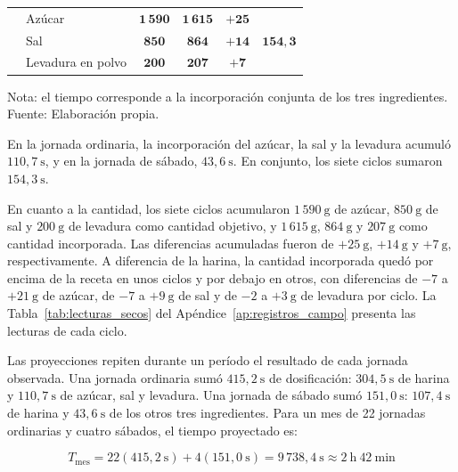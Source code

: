 \begin{table}[H]
\begin{tabular}{llcccc}
         &
        Azúcar & $\mathbf{1\,590}$ & $\mathbf{1\,615}$ & $\mathbf{+25}$ &
         \\
        & Sal & $\mathbf{850}$ & $\mathbf{864}$ & $\mathbf{+14}$ & \\
        & Levadura en polvo & $\mathbf{200}$ & $\mathbf{207}$ &
        $\mathbf{+7}$ & \\
        \bottomrule[1pt]
    \end{tabular}

    \vspace{0.5em}

    {\footnotesize
    Nota: el tiempo corresponde a la incorporación conjunta de los tres
    ingredientes.\\
    Fuente: Elaboración propia.}
\end{table}

En la jornada ordinaria, la incorporación del azúcar, la sal y la levadura
acumuló $110{,}7\ \mathrm{s}$, y en la jornada de sábado,
$43{,}6\ \mathrm{s}$. En conjunto, los siete ciclos sumaron
$154{,}3\ \mathrm{s}$.

En cuanto a la cantidad, los siete ciclos acumularon $1\,590\ \mathrm{g}$
de azúcar, $850\ \mathrm{g}$ de sal y $200\ \mathrm{g}$ de levadura como
cantidad objetivo, y $1\,615\ \mathrm{g}$, $864\ \mathrm{g}$ y
$207\ \mathrm{g}$ como cantidad incorporada. Las diferencias acumuladas
fueron de $+25\ \mathrm{g}$, $+14\ \mathrm{g}$ y $+7\ \mathrm{g}$,
respectivamente. A diferencia de la harina, la cantidad incorporada quedó
por encima de la receta en unos ciclos y por debajo en otros, con
diferencias de $-7$ a $+21\ \mathrm{g}$ de azúcar, de $-7$ a
$+9\ \mathrm{g}$ de sal y de $-2$ a $+3\ \mathrm{g}$ de levadura por
ciclo. La Tabla~\ref{tab:lecturas_secos} del
Apéndice~\ref{ap:registros_campo} presenta las lecturas de cada ciclo.

Las proyecciones repiten durante un período el resultado de cada jornada
observada. Una jornada ordinaria sumó $415{,}2\ \mathrm{s}$ de
dosificación: $304{,}5\ \mathrm{s}$ de harina y $110{,}7\ \mathrm{s}$ de
azúcar, sal y levadura. Una jornada de sábado sumó $151{,}0\ \mathrm{s}$:
$107{,}4\ \mathrm{s}$ de harina y $43{,}6\ \mathrm{s}$ de los otros tres
ingredientes. Para un mes de 22 jornadas ordinarias y cuatro sábados, el
tiempo proyectado es:

\begin{equation*}
T_{\mathrm{mes}}
=
22(415{,}2\ \mathrm{s})
+
4(151{,}0\ \mathrm{s})
=
9\,738{,}4\ \mathrm{s}
\approx
2\ \mathrm{h}\ 42\ \mathrm{min}
\end{equation*}

